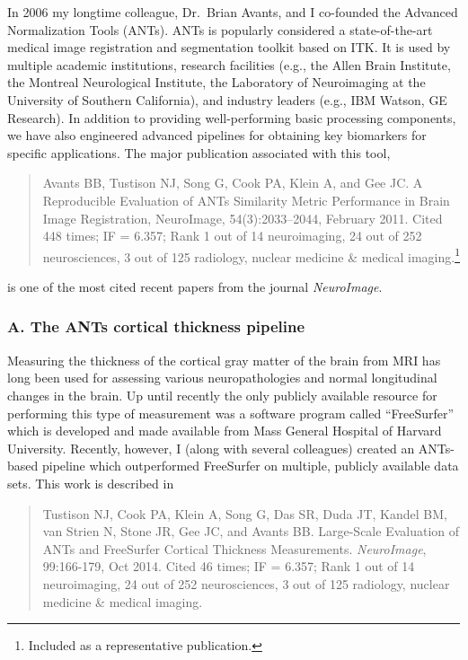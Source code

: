 \documentclass[11pt,]{article}
\let\rmarkdownfootnote\footnote%
\def\footnote{\protect\rmarkdownfootnote}
\begin{document}
In 2006 my longtime colleague, Dr.~Brian Avants, and I co-founded the
Advanced Normalization Tools (ANTs). ANTs is popularly considered a
state-of-the-art medical image registration and segmentation toolkit
based on ITK. It is used by multiple academic institutions, research
facilities (e.g., the Allen Brain Institute, the Montreal Neurological
Institute, the Laboratory of Neuroimaging at the University of Southern
California), and industry leaders (e.g., IBM Watson, GE Research). In
addition to providing well-performing basic processing components, we
have also engineered advanced pipelines for obtaining key biomarkers for
specific applications. The major publication associated with this tool,

\begin{quote}
Avants BB, Tustison NJ, Song G, Cook PA, Klein A, and Gee JC. A
Reproducible Evaluation of ANTs Similarity Metric Performance in Brain
Image Registration, NeuroImage, 54(3):2033--2044, February 2011. Cited
448 times; IF = 6.357; Rank 1 out of 14 neuroimaging, 24 out of 252
neurosciences, 3 out of 125 radiology, nuclear medicine \& medical
imaging.\footnote{Included as a representative publication.}
\end{quote}

is one of the most cited recent papers from the journal
\emph{NeuroImage}.

\subsubsection{A. The ANTs cortical thickness
pipeline}\label{a.-the-ants-cortical-thickness-pipeline}

Measuring the thickness of the cortical gray matter of the brain from
MRI has long been used for assessing various neuropathologies and normal
longitudinal changes in the brain. Up until recently the only publicly
available resource for performing this type of measurement was a
software program called ``FreeSurfer'' which is developed and made
available from Mass General Hospital of Harvard University. Recently,
however, I (along with several colleagues) created an ANTs-based
pipeline which outperformed FreeSurfer on multiple, publicly available
data sets. This work is described in

\begin{quote}
Tustison NJ, Cook PA, Klein A, Song G, Das SR, Duda JT, Kandel BM, van
Strien N, Stone JR, Gee JC, and Avants BB. Large-Scale Evaluation of
ANTs and FreeSurfer Cortical Thickness Measurements. \emph{NeuroImage},
99:166-179, Oct 2014. Cited 46 times; IF = 6.357; Rank 1 out of 14
neuroimaging, 24 out of 252 neurosciences, 3 out of 125 radiology,
nuclear medicine \& medical imaging.
\end{quote}
\end{document}
